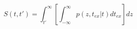\begin{equation}
S(t,t') = \int_{t'}^{\infty} \left[ \int_{-\infty}^\infty p(z,t_{ex}|t) dt_{ex}\right] dz
\end{equation}